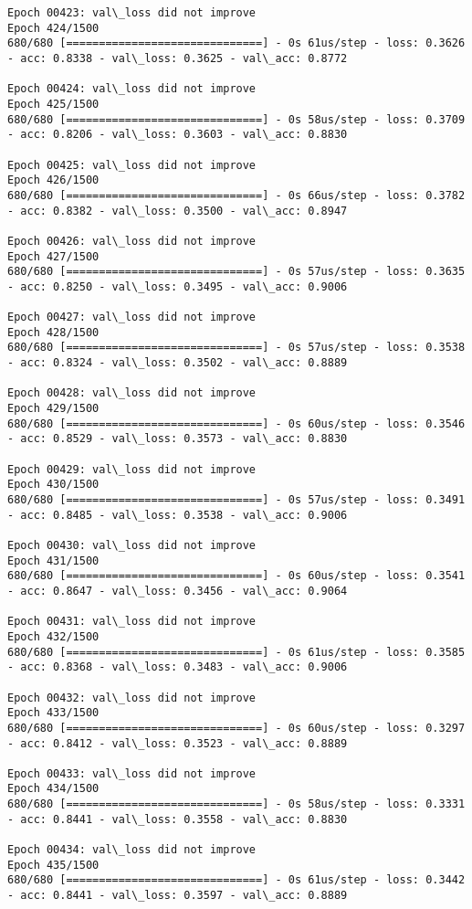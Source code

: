 \documentclass[11pt]{article}
\begin{document}
\begin{Verbatim}[commandchars=\\\{\}]
Epoch 00423: val\_loss did not improve
Epoch 424/1500
680/680 [==============================] - 0s 61us/step - loss: 0.3626 - acc: 0.8338 - val\_loss: 0.3625 - val\_acc: 0.8772

Epoch 00424: val\_loss did not improve
Epoch 425/1500
680/680 [==============================] - 0s 58us/step - loss: 0.3709 - acc: 0.8206 - val\_loss: 0.3603 - val\_acc: 0.8830

Epoch 00425: val\_loss did not improve
Epoch 426/1500
680/680 [==============================] - 0s 66us/step - loss: 0.3782 - acc: 0.8382 - val\_loss: 0.3500 - val\_acc: 0.8947

Epoch 00426: val\_loss did not improve
Epoch 427/1500
680/680 [==============================] - 0s 57us/step - loss: 0.3635 - acc: 0.8250 - val\_loss: 0.3495 - val\_acc: 0.9006

Epoch 00427: val\_loss did not improve
Epoch 428/1500
680/680 [==============================] - 0s 57us/step - loss: 0.3538 - acc: 0.8324 - val\_loss: 0.3502 - val\_acc: 0.8889

Epoch 00428: val\_loss did not improve
Epoch 429/1500
680/680 [==============================] - 0s 60us/step - loss: 0.3546 - acc: 0.8529 - val\_loss: 0.3573 - val\_acc: 0.8830

Epoch 00429: val\_loss did not improve
Epoch 430/1500
680/680 [==============================] - 0s 57us/step - loss: 0.3491 - acc: 0.8485 - val\_loss: 0.3538 - val\_acc: 0.9006

Epoch 00430: val\_loss did not improve
Epoch 431/1500
680/680 [==============================] - 0s 60us/step - loss: 0.3541 - acc: 0.8647 - val\_loss: 0.3456 - val\_acc: 0.9064

Epoch 00431: val\_loss did not improve
Epoch 432/1500
680/680 [==============================] - 0s 61us/step - loss: 0.3585 - acc: 0.8368 - val\_loss: 0.3483 - val\_acc: 0.9006

Epoch 00432: val\_loss did not improve
Epoch 433/1500
680/680 [==============================] - 0s 60us/step - loss: 0.3297 - acc: 0.8412 - val\_loss: 0.3523 - val\_acc: 0.8889

Epoch 00433: val\_loss did not improve
Epoch 434/1500
680/680 [==============================] - 0s 58us/step - loss: 0.3331 - acc: 0.8441 - val\_loss: 0.3558 - val\_acc: 0.8830

Epoch 00434: val\_loss did not improve
Epoch 435/1500
680/680 [==============================] - 0s 61us/step - loss: 0.3442 - acc: 0.8441 - val\_loss: 0.3597 - val\_acc: 0.8889


\end{Verbatim}
\end{document}
